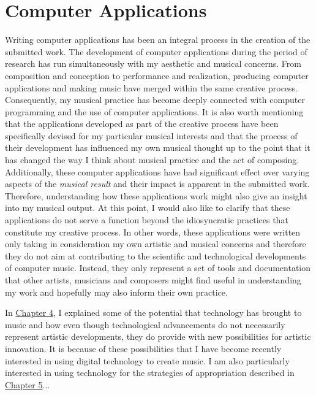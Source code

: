 \hypertarget{chapter6}{}
\chapter{Computer Applications}

Writing computer applications has been an integral process in the creation of the submitted work. The development of computer applications during the period of research has run simultaneously with my aesthetic and musical concerns. From composition and conception to performance and realization, producing computer applications and making music have merged within the same creative process. Consequently, my musical practice has become deeply connected with computer programming and the use of computer applications. It is also worth mentioning that the applications developed as part of the creative process have been specifically devised for my particular musical interests and that the process of their development has influenced my own musical thought up to the point that it has changed the way I think about musical practice and the act of composing. Additionally, these computer applications have had significant effect over varying aspects of the \emph{musical result} and their impact is apparent in the submitted work. Therefore, understanding how these applications work might also give an insight into my musical output. At this point, I would also like to clarify that these applications do not serve a function beyond the idiosyncratic practices that constitute my creative process. In other words, these applications were written only taking in consideration my own artistic and musical concerns and therefore they do not aim at contributing to the scientific and technological developments of computer music. Instead, they only represent a set of tools and documentation that other artists, musicians and composers might find useful in understanding my work and hopefully may also inform their own practice.

In \hyperlink{chapter4}{Chapter 4}, I explained some of the potential that technology has brought to music and how even though technological advancements do not necessarily represent artistic developments, they do provide with new possibilities for artistic innovation. It is because of these possibilities that I have become recently interested in using digital technology to create music. I am also particularly interested in using technology for the strategies of appropriation described in \hyperlink{chapter5}{Chapter 5}... 
 
